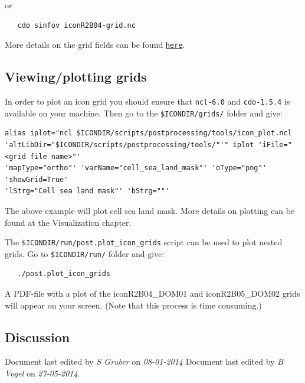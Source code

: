 or

\begin{small}
  \begin{verbatim}
   cdo sinfov iconR2B04-grid.nc
  \end{verbatim}
\end{small}


More details on the grid fields can be found \href{https://code.zmaw.de/projects/icon/repository/entry/trunk/icon-1.3.00/doc/technical/icon\_grid.pdf} {\tt here}.\\

\subsection{Viewing/plotting grids}

In order to plot an icon grid you should ensure that \verb+ncl-6.0+ and \verb+cdo-1.5.4+ is available on your machine. Then go to the \verb+$ICONDIR/grids/+ folder and give:

\begin{small}
  \begin{verbatim}
alias iplot="ncl $ICONDIR/scripts/postprocessing/tools/icon_plot.ncl 
'altLibDir="$ICONDIR/scripts/postprocessing/tools/"'" iplot 'iFile="<grid file name>"' 
'mapType="ortho"' 'varName="cell_sea_land_mask"' 'oType="png"' 'showGrid=True' 
'lStrg="Cell sea land mask"' 'bStrg=""'
  \end{verbatim}
\end{small}



The above example will plot cell sea land mask. More details on plotting can be found at the Visualization chapter.

The \verb+$ICONDIR/run/post.plot_icon_grids+ script can be used to plot nested grids. Go to \verb+$ICONDIR/run/+ folder and give:

\begin{small}
  \begin{verbatim}
   ./post.plot_icon_grids  
  \end{verbatim}
\end{small}

A PDF-file with a plot of the iconR2B04\_DOM01 and iconR2B05\_DOM02 grids will appear on your screen. (Note that this process is time consuming.)

\newpage
\subsection*{Discussion}
Document last edited by \textit{S Gruber} on \textit{08-01-2014}
Document last edited by \textit{B Vogel} on \textit{27-05-2014}.
